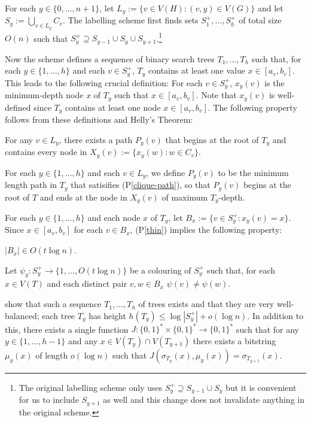 \documentclass{patmorin}
\newcommand{\pref}[1]{(P\ref{#1})}
\begin{document}
For each $y\in\{0,\ldots,n+1\}$, let $L_y:=\{v\in V(H): (v,y)\in V(G)\}$ and let $S_y:=\bigcup_{v\in L_y}C_v$.  The labelling scheme first finds sets $S^+_1,\ldots,S^+_h$ of total size $O(n)$ such that $S^+_y\supseteq S_{y-1}\cup S_y\cup S_{y+1}$.\footnote{The original labelling scheme only uses $S^+_y\supseteq S_{y-1}\cup S_y$ but it is convenient for us to include $S_{y+1}$ as well and this change does not invalidate anything in the original scheme.}

Now the scheme defines a sequence of binary search trees $T_1,\ldots,T_h$ such that, for each $y\in\{1,\ldots,h\}$ and each $v\in S^+_y$, $T_y$ contains at least one value $x\in [a_v,b_v]$.  This leads to the following crucial definition: For each $v\in S^+_y$, $x_{y}(v)$ is the minimum-depth node $x$ of $T_y$ such that $x\in [a_v,b_v]$. Note that $x_y(v)$ is well-defined since $T_y$ contains at least one node $x\in[a_v,b_v]$.   The following property follows from these definitions and Helly's Theorem:

\begin{compactenum}[(P1)]\setcounter{enumi}{1}
    \item For any $v\in L_y$, there exists a path $P_y(v)$ that begins at the root of $T_y$ and contains every node in $X_y(v):=\{x_{y}(w): w\in C_v\}$.\label{clique-path}
\end{compactenum}

For each $y\in\{1,\ldots,h\}$ and each $v\in L_y$, we define $P_y(v)$ to be the minimum length path in $T_y$ that satisifies \pref{clique-path}, so that $P_y(v)$ begins at the root of $T$ and ends at the node in $X_y(v)$ of maximum $T_y$-depth.

For each $y\in\{1,\ldots,h\}$ and each node $x$ of $T_y$, let $B_x:=\{v\in S^+_y: x_y(v)=x\}$.  Since $x\in[a_v,b_v]$ for each $v\in B_x$, \pref{thin} implies the following property:
\begin{compactenum}[(P1)]\setcounter{enumi}{2}
    \item $|B_x|\in O(t\log n)$. \label{small-bags-i}
\end{compactenum}
Let $\psi_y:S^+_y\to\{1,\ldots,O(t\log n)\}$ be a colouring of $S^+_y$ such that, for each $x\in V(T)$ and each distinct pair $v,w\in B_x$ $\psi(v)\neq\psi(w)$.

\citet{dujmovic.esperet.ea:adjacency} show that such a sequence $T_1,\ldots,T_h$ of trees exists and that they are very well-balanced; each tree $T_y$ has height $h(T_y)\le \log|S^+_y|+o(\log n)$.  In addition to this, there exists a single function $J:\{0,1\}^*\times\{0,1\}^*\to\{0,1\}^*$ such that for any $y\in\{1,\ldots,h-1\}$ and any $x\in V(T_y)\cap V(T_{y+1})$ there exists a bitstring $\mu_y(x)$ of length $o(\log n)$ such that $J(\sigma_{T_y}(x),\mu_y(x))=\sigma_{T_{y+1}}(x)$.
\end{document}
